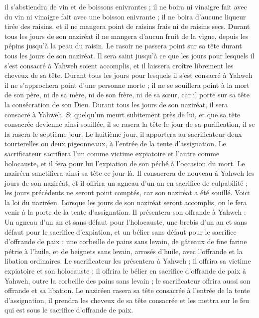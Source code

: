 \begin{multicols}{2}
il s'abstiendra de vin et de boissons enivrantes ; il ne boira ni vinaigre fait avec du vin ni vinaigre fait avec une boisson enivrante ; il ne boira d’aucune liqueur tirée des raisins, et il ne mangera point de raisins frais ni de raisins secs.
Durant tous les jours de son naziréat il ne mangera d'aucun fruit de la vigne, depuis les pépins jusqu'à la peau du raisin.
Le rasoir ne passera point sur sa tête durant tous les jours de son naziréat. Il sera saint jusqu'à ce que les jours pour lesquels il s'est consacré à Yahweh soient accomplis, et il laissera croître librement les cheveux de sa tête.
Durant tous les jours pour lesquels il s'est consacré à Yahweh il ne s'approchera point d’une personne morte ;
il ne se souillera point à la mort de son père, ni de sa mère, ni de son frère, ni de sa sœur, car il porte sur sa tête la consécration de son Dieu.
Durant tous les jours de son naziréat, il sera consacré à Yahweh.
Si quelqu'un meurt subitement près de lui, et que sa tête consacrée devienne ainsi souillée, il se rasera la tête le jour de sa purification, il se la rasera le septième jour.
Le huitième jour, il apportera au sacrificateur deux tourterelles ou deux pigeonneaux, à l'entrée de la tente d'assignation.
Le sacrificateur sacrifiera l’un comme victime expiatoire et l'autre comme holocauste, et il fera pour lui l’expiation de son péché à l'occasion du mort. Le naziréen sanctifiera ainsi sa tête ce jour-là.
Il consacrera de nouveau à Yahweh les jours de son naziréat, et il offrira un agneau d'un an en sacrifice de culpabilité ; les jours précédents ne seront point comptés, car son naziréat a été souillé.
Voici la loi du naziréen. Lorsque les jours de son naziréat seront accomplis, on le fera venir à la porte de la tente d'assignation.
Il présentera son offrande à Yahweh : Un agneau d'un an et sans défaut pour l’holocauste, une brebis d'un an et sans défaut pour le sacrifice d’expiation, et un bélier sans défaut pour le sacrifice d’offrande de paix ;
une corbeille de pains sans levain, de gâteaux de fine farine pétrie à l'huile, et de beignets sans levain, arrosés d'huile, avec l’offrande et la libation ordinaires.
Le sacrificateur les présentera à Yahweh ; il offrira sa victime expiatoire et son holocauste ;
il offrira le bélier en sacrifice d’offrande de paix à Yahweh, outre la corbeille des pains sans levain ; le sacrificateur offrira aussi son offrande et sa libation.
Le naziréen rasera sa tête consacrée à l'entrée de la tente d'assignation, il prendra les cheveux de sa tête consacrée et les mettra sur le feu qui est sous le sacrifice d’offrande de paix.

\end{multicols}
